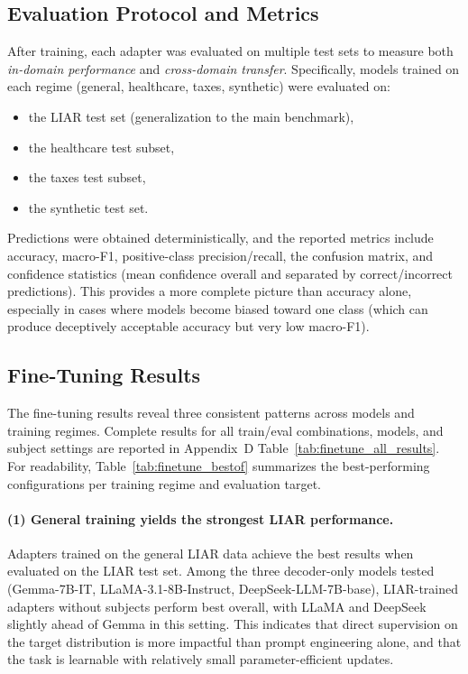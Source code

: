 \subsection{Evaluation Protocol and Metrics}

After training, each adapter was evaluated on multiple test sets to measure both \emph{in-domain performance} and \emph{cross-domain transfer}. Specifically, models trained on each regime (general, healthcare, taxes, synthetic) were evaluated on:
\begin{itemize}
    \item the LIAR test set (generalization to the main benchmark),
    \item the healthcare test subset,
    \item the taxes test subset,
    \item the synthetic test set.
\end{itemize}

Predictions were obtained deterministically, and the reported metrics include accuracy, macro-F1, positive-class precision/recall, the confusion matrix, and confidence statistics (mean confidence overall and separated by correct/incorrect predictions). This provides a more complete picture than accuracy alone, especially in cases where models become biased toward one class (which can produce deceptively acceptable accuracy but very low macro-F1).

\subsection{Fine-Tuning Results}

The fine-tuning results reveal three consistent patterns across models and training regimes. Complete results for all train/eval combinations, models, and subject settings are reported in Appendix~D Table~\ref{tab:finetune_all_results}. For readability, Table~\ref{tab:finetune_bestof} summarizes the best-performing configurations per training regime and evaluation target.

\paragraph{(1) General training yields the strongest LIAR performance.}
Adapters trained on the general LIAR data achieve the best results when evaluated on the LIAR test set. Among the three decoder-only models tested (Gemma-7B-IT, LLaMA-3.1-8B-Instruct, DeepSeek-LLM-7B-base), LIAR-trained adapters without subjects perform best overall, with LLaMA and DeepSeek slightly ahead of Gemma in this setting. This indicates that direct supervision on the target distribution is more impactful than prompt engineering alone, and that the task is learnable with relatively small parameter-efficient updates.

